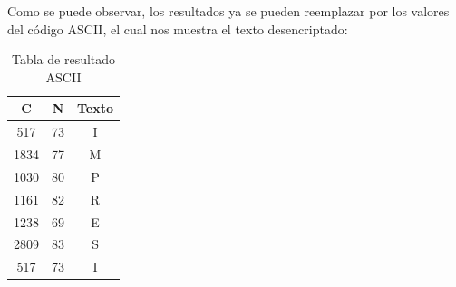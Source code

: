 \FloatBarrier

Como se puede observar, los resultados ya se pueden reemplazar por los valores del código ASCII, el cual nos muestra el texto desencriptado:

\begin{table}[H]
\centering
\caption{Tabla de resultado ASCII}
\label{tab:ascii-result}
\begin{tabular}{|c|c|c|}
\hline
\textbf{C} & \textbf{N} & \textbf{Texto} \\
\hline
517  & 73 & I \\
1834 & 77 & M \\
1030 & 80 & P \\
1161 & 82 & R \\
1238 & 69 & E \\
2809 & 83 & S \\
517  & 73 & I \\
\hline
\end{tabular}
\end{table}


